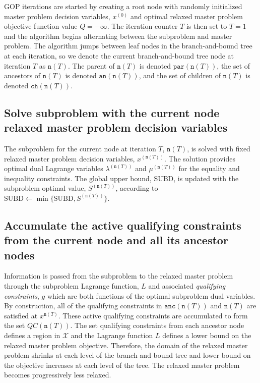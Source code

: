 \documentclass[11pt]{article}
\newcommand{\node}{\texttt{n}}
\newcommand{\parent}{\texttt{par}}
\newcommand{\anc}{\texttt{anc}}
\newcommand{\SUBD}{\text{SUBD}}
\begin{document}
GOP iterations are started by creating a root node with randomly initialized master problem decision variables, $x^{(0)}$ and optimal relaxed master problem objective function value $Q=-\infty$.
The iteration counter $T$ is then set to $T=1$ and the algorithm begins alternating between the subproblem and master problem.
The algorithm jumps between leaf nodes in the branch-and-bound tree at each iteration, so we denote the current branch-and-bound tree node at iteration $T$ as $\node(T)$. The parent of $\node(T)$ is denoted $\parent(\node(T))$, the set of ancestors of $\node(T)$ is denoted $\texttt{an}(\texttt{n}(T))$, and the set of children of $\texttt{n}(T)$ is denoted $\texttt{ch}(\texttt{n}(T))$.

\subsection{Solve subproblem with the current node relaxed master problem decision variables}

The subproblem for the current node at iteration $T$, $\node(T)$, is solved with fixed relaxed master problem decision variables, $x^{(\node(T))}$. 
The solution provides optimal dual Lagrange variables $\lambda^{(\node(T))}$ and $\mu^{(\node(T))}$ for the equality and inequality constraints.
The global upper bound, $\SUBD$, is updated with the subproblem optimal value, $S^{(\node(T))}$, according to $\SUBD \leftarrow \min\{\SUBD, S^{(\node(T))} \}$.

\subsection{Accumulate the active qualifying constraints from the current node and all its ancestor nodes}

Information is passed from the subproblem to the relaxed master problem through the subproblem Lagrange function, $L$ and associated \emph{qualifying constraints}, $g$ which are both functions of the optimal subproblem dual variables. 
By construction, all of the qualifying constraints in $\anc(\node(T))$ and $\node(T)$ are satisfied at $x^{\node(T)}$. 
These active qualifying constraints are accumulated to form the set $QC(\node(T))$.
The set qualifying constraints from each ancestor node defines a region in $\mathcal{X}$ and the Lagrange function $L$ defines a lower bound on the relaxed master problem objective.
Therefore, the domain of the relaxed master problem shrinks at each level of the branch-and-bound tree and lower bound on the objective increases at each level of the tree.
The relaxed master problem becomes progressively less relaxed.
\end{document}
